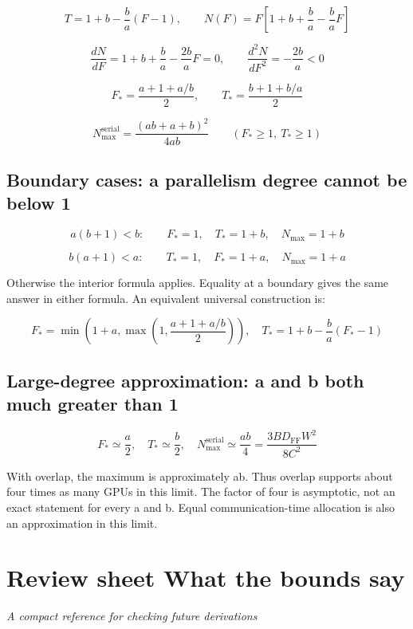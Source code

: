 \documentclass[10pt,a4paper]{article}
\begin{document}
\[T=1+b-\frac{b}{a}(F-1),\qquad N(F)=F\left[1+b+\frac{b}{a}-\frac{b}{a}F\right]\]

\[\frac{dN}{dF}=1+b+\frac{b}{a}-\frac{2b}{a}F=0,\qquad\frac{d^2N}{dF^2}=-\frac{2b}{a}<0\]

\[F_* =\frac{a+1+a/b}{2},\qquad T_* =\frac{b+1+b/a}{2}\]

\[\boxed{N_{\max}^{\mathrm{serial}}=\frac{(ab+a+b)^2}{4ab}\qquad(F_*\geq 1,\ T_*\geq 1)}\]

\subsection*{Boundary cases: a parallelism degree cannot be below 1}

\[a(b+1)<b:\qquad F_*=1,\quad T_*=1+b,\quad N_{\max}=1+b\]

\[b(a+1)<a:\qquad T_*=1,\quad F_*=1+a,\quad N_{\max}=1+a\]

{\small Otherwise the interior formula applies. Equality at a boundary gives the same answer in either formula. An equivalent universal construction is:}\par

\[F_*=\min\!\left(1+a,\max\!\left(1,\frac{a+1+a/b}{2}\right)\right),\quad T_*=1+b-\frac{b}{a}(F_*-1)\]

\subsection*{Large-degree approximation: a and b both much greater than 1}

\[\boxed{F_*\simeq\frac{a}{2},\quad T_*\simeq\frac{b}{2},\quad N_{\max}^{\mathrm{serial}}\simeq\frac{ab}{4}=\frac{3BD_{\mathrm{FF}}W^2}{8C^2}}\]

{\small With overlap, the maximum is approximately ab. Thus overlap supports about four times as many GPUs in this limit. The factor of four is asymptotic, not an exact statement for every a and b. Equal communication-time allocation is also an approximation in this limit.}\par

\clearpage

\section*{Review sheet \textperiodcentered{} What the bounds say}

\textit{A compact reference for checking future derivations}\par
\end{document}

